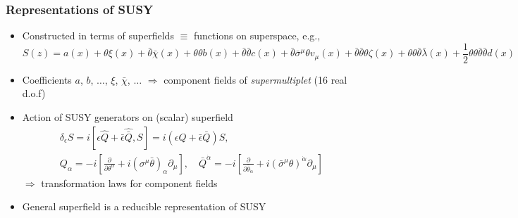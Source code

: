 \documentclass[10pt,aspectratio=169]{beamer}
\begin{document}
\begin{frame}
  \frametitle{Representations of SUSY}
  \begin{itemize}\itemsep1em
  \item Constructed in terms of superfields $\equiv$ functions on superspace,
    e.g.,
    \begin{equation*}
      S(z) = a(x) + \theta \xi(x) + \bar{\theta} \bar{\chi}(x) +
      \theta \theta b(x) + \bar{\theta} \bar{\theta} c(x) + \bar{\theta}
      \bar{\sigma}^\mu \theta v_\mu (x)
      + \bar{\theta} \bar{\theta} \theta \zeta(x)
      + \theta \theta \bar{\theta} \bar{\lambda} (x) + \frac{1}{2} \theta
      \theta \bar{\theta} \bar{\theta} d(x)
    \end{equation*}
  \item Coefficients $a$, $b$, $\ldots$, $\xi$, $\bar{\chi}$, $\ldots$
    $\Rightarrow$ component fields of \emph{supermultiplet} (16 real d.o.f)
  \item Action of SUSY generators on (scalar) superfield
    \begin{gather*}
      \delta_\epsilon S = i \left [ \epsilon \hat{Q} + \bar{\epsilon}
        \hat{\bar{Q}}, S \right ]
      = i \left ( \epsilon Q + \bar{\epsilon} \bar{Q} \right ) S ,
      \\
      Q_\alpha = -i \left [ \frac{\partial}{\partial \theta^\alpha}
        + i \left ( \sigma^\mu \bar{\theta} \right )_\alpha
        \partial_\mu \right ] , \quad
      \bar{Q}^{\dot{\alpha}} = -i \left [
        \frac{\partial}{\partial \bar{\theta}_{\dot{\alpha}}} + i \left (
        \bar{\sigma}^\mu \theta \right )^{\dot{\alpha}} \partial_\mu \right ]
    \end{gather*}
    $\Rightarrow$ transformation laws for component fields
  \item General superfield is a \alert{reducible representation of SUSY}
  \end{itemize}
\end{frame}
\end{document}
